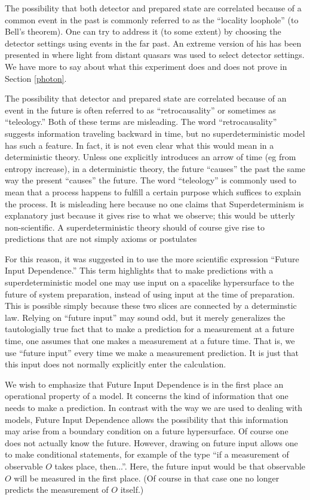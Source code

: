 \documentclass[12pt]{article}
\begin{document}
The possibility that both detector and prepared state are correlated because of a common event in the past is commonly referred to as the ``locality loophole'' (to Bell's theorem). One can try to address it (to some extent) by choosing the detector settings using events in the far past. An extreme version of his has been presented in \cite{Handsteiner:2016ulx} where light from distant quasars was used to select detector settings. We have more to say about what this experiment does and does not prove in Section \ref{photon}.

The possibility that detector and prepared state are correlated because of an event in the future is often referred to as ``retrocausality'' or sometimes as ``teleology.'' Both of these terms are misleading. The word ``retrocausality'' suggests information traveling backward in time, but no superdeterministic model has such a feature. In fact, it is not even clear what this would mean in a deterministic theory. Unless one explicitly introduces an arrow of time (eg from entropy increase), in a deterministic theory, the future ``causes'' the past the same way the present ``causes'' the future. The word ``teleology'' is commonly used to mean that a process happens to fulfill a certain purpose which suffices to explain the process. It is misleading here because no one claims that Superdeterminism is explanatory just because it gives rise to what we observe; this would be utterly non-scientific. A superdeterministic theory should of course give rise to predictions that are not simply axioms or postulates

For this reason, it was suggested in \cite{Wharton} to use the more scientific expression ``Future Input Dependence.'' This term highlights that to make predictions with a superdeterministic model one may use input on a spacelike hypersurface to the future of system preparation, instead of using input at the time of preparation. This is possible simply because these two slices are connected by a determinstic law. Relying on ``future input'' may sound odd, but it merely generalizes the tautologially true fact that to make a prediction for a measurement at a future time, one assumes that one makes a measurement at a future time. That is, we use ``future input'' every time we make a measurement prediction. It is just that this input does not normally explicitly enter the calculation. 

We wish to emphasize that Future Input Dependence is in the first place an operational property of a model. It concerns the kind of information that one needs to make a prediction. In contrast with the way we are used to dealing with models, Future Input Dependence allows the possibility that this information may arise from a boundary condition on a future hypersurface. Of course one does not actually know the future. However, drawing on future input allows one to make conditional statements, for example of the type ``if a measurement of observable $O$ takes place, then...''. Here, the future input would be that observable $O$ will be measured in the first place. (Of course in that case one no longer predicts the measurement of $O$ itself.)
\end{document}
